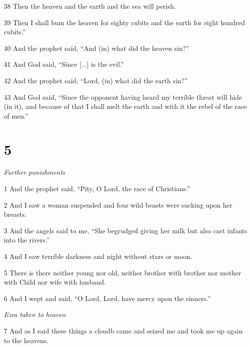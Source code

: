 \par 38 Then the heaven and the earth and the sea will perish.

\par 39 Then I shall bum the heaven for eighty cubits and the earth for eight hundred cubits.”

\par 40 And the prophet said, “And (in) what did the heaven sin?”

\par 41 And God said, “Since [...] is the evil.” 

\par 42 And the prophet said, “Lord, (in) what did the earth sin?”

\par 43 And God said, “Since the opponent having heard my terrible threat will hide (in it), and because of that I shall melt the earth and with it the rebel of the race of men.”

\chapter{5}

\par \textit{Further punishments}

\par 1 And the prophet said, “Pity, O Lord, the race of Christians.” 

\par 2 And I saw a woman suspended and four wild beasts were sucking upon her breasts.

\par 3 And the angels said to me, “She begrudged giving her milk but also cast infants into the rivers.”

\par 4 And I saw terrible darkness and night without stars or moon. 

\par 5 There is there neither young nor old, neither brother with brother nor mother with Child nor wife with husband.

\par 6 And I wept and said, “O Lord, Lord, have mercy upon the sinners.”

\par \textit{Ezra taken to heaven}

\par 7 And as I said these things a cloudb came and seized me and took me up again to the heavens.

